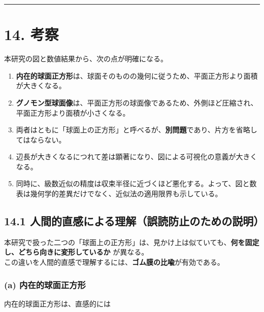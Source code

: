 \documentclass[
  12pt,
  a4paper,
]{article}
\providecommand{\tightlist}{%
  \setlength{\itemsep}{0pt}\setlength{\parskip}{0pt}}
\begin{document}
\begin{center}\rule{0.5\linewidth}{0.5pt}\end{center}

\section{14. 考察}\label{ux8003ux5bdf}

本研究の図と数値結果から、次の点が明確になる。

\begin{enumerate}
\def\labelenumi{\arabic{enumi}.}
\tightlist
\item
  \textbf{内在的球面正方形}は、球面そのものの幾何に従うため、平面正方形より面積が大きくなる。\\
\item
  \textbf{グノモン型球面像}は、平面正方形の球面像であるため、外側ほど圧縮され、平面正方形より面積が小さくなる。\\
\item
  両者はともに「球面上の正方形」と呼べるが、\textbf{別問題}であり、片方を省略してはならない。\\
\item
  辺長が大きくなるにつれて差は顕著になり、図による可視化の意義が大きくなる。\\
\item
  同時に、級数近似の精度は収束半径に近づくほど悪化する。よって、図と数表は幾何学的差異だけでなく、近似法の適用限界も示している。
\end{enumerate}

\subsection{14.1
人間的直感による理解（誤読防止のための説明）}\label{ux4ebaux9593ux7684ux76f4ux611fux306bux3088ux308bux7406ux89e3ux8aa4ux8aadux9632ux6b62ux306eux305fux3081ux306eux8aacux660e}

本研究で扱った二つの「球面上の正方形」は、見かけ上は似ていても、\textbf{何を固定し、どちら向きに変形しているか}
が異なる。\\
この違いを人間的直感で理解するには、\textbf{ゴム膜の比喩}が有効である。

\subsubsection{(a)
内在的球面正方形}\label{a-ux5185ux5728ux7684ux7403ux9762ux6b63ux65b9ux5f62}

内在的球面正方形は、直感的には
\end{document}
